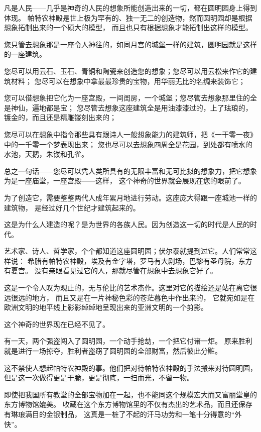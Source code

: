 \documentclass[12pt,UTF8]{ctexbook}
\begin{document}
凡是人民——几乎是神奇的人民的想象所能创造出来的一切，都在圆明园身上得到体现。
帕特农神殿是世上极为罕有的、独一无二的创造物，然而圆明园却是根据想象拓制出来的一个硕大的模型，
而且也只有根据想象才能拓制出这样的模型。

您只管去想象那是一座令人神往的，如同月宫的城堡一样的建筑，圆明园就是这样的一座建筑。

您尽可以用云石、玉石、青铜和陶瓷来创造您的想象；您尽可以用云松来作它的建筑材料；
您尽可以在想象中拿最最珍贵的宝物，用华丽无比的名绸来装饰它；

您可以借想象把它化为一座宫殿，一间闺房，一个城堡；您尽管去想象那里住的全是神仙，遍地都是宝；
您尽管去想象这座建筑全是用油漆漆过的，上了珐琅的，镀金的，而且还是精雕镂刻出来的；

您尽可以在想象中指令那些具有跟诗人一般想象能力的建筑师，把《一干零一夜》中的一千零一个梦表现出来；
您也尽可以去想象四周全是花园，到处都有喷水的水池，天鹅，朱镂和孔雀。

总之一句话——您尽可以凭人类所具有的无限丰富和无可比拟的想象力，把它想象为是一座庙堂，一座宫殿——这样，
这个神奇的世界就会展现在您的眼前了。

为了创造它，需要整整两代人成年累月地进行劳动。这座庞大得跟一座城池一样的建筑物，
是经过好几个世纪才建筑起来的。

这是为什么人建造的呢？是为世界的各族人民。因为创造这一切的时代是人民的时代。

艺术家、诗人、哲学家，个个都知道这座圆明园；伏尔泰就提到过它。人们常常这样说：
希腊有帕特农神殿，埃及有金字塔，罗马有大剧场，巴黎有圣母院，东方有夏宫。
没有亲眼看见过它的人，那就尽管在想象中去想象它好了。

这是一个令人叹为观止的，无与伦比的艺术杰作。这里对它的描绘还是站在离它很远很远的地方，
而且又是在一片神秘色彩的苍茫暮色中作出来的，
它就宛如是在欧洲文明的地平线上影影绰绰地呈现出来的亚洲文明的一个剪影。

这个神奇的世界现在已经不见了。

有一天，两个强盗闯入了圆明园，一个动手抢劫，一个把它付诸一炬。
原来胜利就是进行一场掠夺，胜利者盗窃了圆明园的全部财富，然后彼此分赃。

这不禁使人想起帕特农神殿的事。他们把对待帕特农神殿的手法搬来对待圆明园，
但是这一次做得更是干脆，更是彻底，一扫而光，不留一物。

即使把我国所有教堂的全部宝物加在一起，也不能同这个规模宏大而又富丽堂皇的东方博物馆媲美。
收藏在这个东方博物馆里的不仅有杰出的艺术品，而且还保存有琳琅满目的金银制品，
这真是一桩了不起的汗马功劳和一笔十分得意的“外快”。
\end{document}
